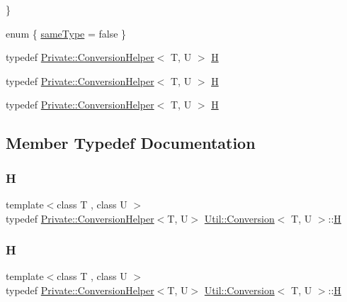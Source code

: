 \begin{DoxyCompactItemize}
 \}
\item 
enum \{ \mbox{\hyperlink{structUtil_1_1Conversion_a4da7b6dc72f967fd56f78ae38dc05595a13c57e92754abd0dafc432097f46553d}{same\+Type}} = false
 \}
\item 
typedef \mbox{\hyperlink{structUtil_1_1Private_1_1ConversionHelper}{Private\+::\+Conversion\+Helper}}$<$ T, U $>$ \mbox{\hyperlink{structUtil_1_1Conversion_a2f11e8da88ca0599a47c7d9fcc3ff2f2}{H}}
\item 
typedef \mbox{\hyperlink{structUtil_1_1Private_1_1ConversionHelper}{Private\+::\+Conversion\+Helper}}$<$ T, U $>$ \mbox{\hyperlink{structUtil_1_1Conversion_a2f11e8da88ca0599a47c7d9fcc3ff2f2}{H}}
\item 
typedef \mbox{\hyperlink{structUtil_1_1Private_1_1ConversionHelper}{Private\+::\+Conversion\+Helper}}$<$ T, U $>$ \mbox{\hyperlink{structUtil_1_1Conversion_a2f11e8da88ca0599a47c7d9fcc3ff2f2}{H}}
\end{DoxyCompactItemize}


\subsection{Member Typedef Documentation}
\mbox{\label{structUtil_1_1Conversion_a2f11e8da88ca0599a47c7d9fcc3ff2f2}} 
\subsubsection{\texorpdfstring{H}{H}\hspace{0.1cm}{\footnotesize\ttfamily [1/3]}}
{\footnotesize\ttfamily template$<$class T , class U $>$ \\
typedef \mbox{\hyperlink{structUtil_1_1Private_1_1ConversionHelper}{Private\+::\+Conversion\+Helper}}$<$T, U$>$ \mbox{\hyperlink{structUtil_1_1Conversion}{Util\+::\+Conversion}}$<$ T, U $>$\+::\mbox{\hyperlink{structUtil_1_1Conversion_a2f11e8da88ca0599a47c7d9fcc3ff2f2}{H}}}

\mbox{\label{structUtil_1_1Conversion_a2f11e8da88ca0599a47c7d9fcc3ff2f2}} 
\subsubsection{\texorpdfstring{H}{H}\hspace{0.1cm}{\footnotesize\ttfamily [2/3]}}
{\footnotesize\ttfamily template$<$class T , class U $>$ \\
typedef \mbox{\hyperlink{structUtil_1_1Private_1_1ConversionHelper}{Private\+::\+Conversion\+Helper}}$<$T, U$>$ \mbox{\hyperlink{structUtil_1_1Conversion}{Util\+::\+Conversion}}$<$ T, U $>$\+::\mbox{\hyperlink{structUtil_1_1Conversion_a2f11e8da88ca0599a47c7d9fcc3ff2f2}{H}}}

